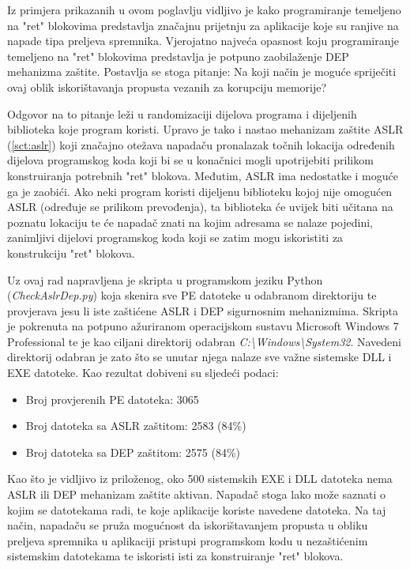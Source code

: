 \documentclass[times, utf8, diplomski, numeric]{fer}
\begin{document}
Iz primjera prikazanih u ovom poglavlju vidljivo je kako programiranje temeljeno na "ret" blokovima predstavlja značajnu prijetnju za aplikacije koje su ranjive na napade tipa preljeva spremnika. Vjerojatno najveća opasnost koju programiranje temeljeno na "ret" blokovima predstavlja je potpuno zaobilaženje DEP mehanizma zaštite. Postavlja se stoga pitanje: Na koji način je moguće spriječiti ovaj oblik iskorištavanja propusta vezanih za korupciju memorije? 

Odgovor na to pitanje leži u randomizaciji dijelova programa i dijeljenih biblioteka koje program koristi. Upravo je tako i nastao mehanizam zaštite ASLR (\ref{sct:aslr}) koji značajno otežava napadaču pronalazak točnih lokacija određenih dijelova programskog koda koji bi se u konačnici mogli upotrijebiti prilikom konstruiranja potrebnih "ret" blokova. Međutim, ASLR ima nedostatke i moguće ga je zaobići. Ako neki program koristi dijeljenu biblioteku kojoj nije omogućen ASLR (određuje se prilikom prevođenja), ta biblioteka će uvijek biti učitana na poznatu lokaciju te će napadač znati na kojim adresama se nalaze pojedini, zanimljivi dijelovi programskog koda koji se zatim mogu iskoristiti za konstrukciju "ret" blokova.

Uz ovaj rad napravljena je skripta u programskom jeziku Python (\emph{CheckAslrDep.py}) koja skenira sve PE datoteke u odabranom direktoriju te provjerava jesu li iste zaštićene ASLR i DEP sigurnosnim mehanizmima. Skripta je pokrenuta na potpuno ažuriranom operacijskom sustavu Microsoft Windows 7 Professional te je kao ciljani direktorij odabran \emph{C:\textbackslash Windows\textbackslash System32}. Navedeni direktorij odabran je zato što se unutar njega nalaze sve važne sistemske DLL i EXE datoteke. Kao rezultat dobiveni su sljedeći podaci:

\begin{itemize}
\item Broj provjerenih PE datoteka: 3065
\item Broj datoteka sa ASLR zaštitom: 2583 (84\%)
\item Broj datoteka sa DEP zaštitom: 2575 (84\%)
\end{itemize}

Kao što je vidljivo iz priloženog, oko 500 sistemskih EXE i DLL datoteka nema ASLR ili DEP mehanizam zaštite aktivan. Napadač stoga lako može saznati o kojim se datotekama radi, te koje aplikacije koriste navedene datoteka. Na taj način, napadaču se pruža mogućnost da iskorištavanjem propusta u obliku preljeva spremnika u aplikaciji pristupi programskom kodu u nezaštićenim sistemskim datotekama te iskoristi isti za konstruiranje "ret" blokova.
\end{document}
